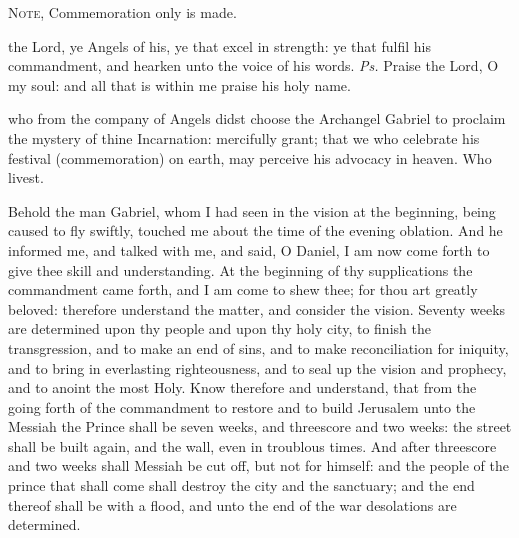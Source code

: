 \clearpage
{}

\begin{rubric}
	\textsc{Note,} Commemoration only is made.
\end{rubric}

\introit
{} the Lord, ye Angels of his, ye that excel in strength: ye that fulfil his commandment, and hearken unto the voice of his words. \textit{Ps.} Praise the Lord, O my soul: and all that is within me praise his holy name.

\collect
{} who from the company of Angels didst choose the Archangel Gabriel to proclaim the mystery of thine Incarnation: mercifully grant; that we who celebrate his festival (commemoration) on earth, may perceive his advocacy in heaven. Who livest.

 Behold the man Gabriel, whom I had seen in the vision at the beginning, being caused to fly swiftly, touched me about the time of the evening oblation. And he informed me, and talked with me, and said, O Daniel, I am now come forth to give thee skill and understanding. At the beginning of thy supplications the commandment came forth, and I am come to shew thee; for thou art greatly beloved: therefore understand the matter, and consider the vision. Seventy weeks are determined upon thy people and upon thy holy city, to finish the transgression, and to make an end of sins, and to make reconciliation for iniquity, and to bring in everlasting righteousness, and to seal up the vision and prophecy, and to anoint the most Holy. Know therefore and understand, that from the going forth of the commandment to restore and to build Jerusalem unto the Messiah the Prince shall be seven weeks, and threescore and two weeks: the street shall be built again, and the wall, even in troublous times. And after threescore and two weeks shall Messiah be cut off, but not for himself: and the people of the prince that shall come shall destroy the city and the sanctuary; and the end thereof shall be with a flood, and unto the end of the war desolations are determined.


